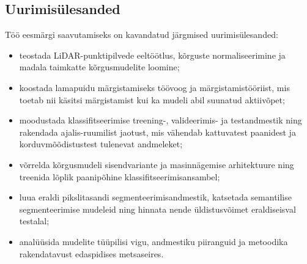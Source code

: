 \subsection{Uurimisülesanded}

Töö eesmärgi saavutamiseks on kavandatud järgmised uurimisülesanded:
\begin{itemize}
    \item teostada LiDAR-punktipilvede eeltöötlus, kõrguste normaliseerimine ja madala taimkatte kõrgusmudelite loomine;
    \item koostada lamapuidu märgistamiseks töövoog ja märgistamistööriist, mis toetab nii käsitsi märgistamist kui ka mudeli abil suunatud aktiivõpet;
    \item moodustada klassifitseerimise treening-, valideerimis- ja testandmestik ning rakendada ajalis-ruumilist jaotust, mis vähendab kattuvatest paanidest ja korduvmõõdistustest tulenevat andmeleket;
    \item võrrelda kõrgusmudeli sisendvariante ja masinnägemise arhitektuure ning treenida lõplik paanipõhine klassifitseerimisansambel;
    \item luua eraldi pikslitasandi segmenteerimisandmestik, katsetada semantilise segmenteerimise mudeleid ning hinnata nende üldistusvõimet eraldiseisval testalal;
    \item analüüsida mudelite tüüpilisi vigu, andmestiku piiranguid ja metoodika rakendatavust edaspidises metsaseires.
\end{itemize}
